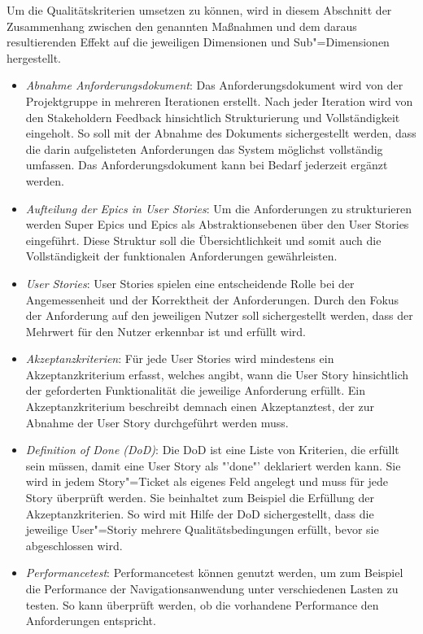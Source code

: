 Um die Qualitätskriterien umsetzen zu können, wird in diesem Abschnitt der Zusammenhang zwischen den genannten Maßnahmen und dem daraus resultierenden Effekt auf die jeweiligen Dimensionen und Sub"=Dimensionen hergestellt.
\begin{itemize}
    \item	\textit{Abnahme Anforderungsdokument}: Das Anforderungsdokument wird von der Projektgruppe in mehreren Iterationen erstellt. Nach jeder Iteration wird von den Stakeholdern Feedback hinsichtlich Strukturierung und Vollständigkeit eingeholt. So soll mit der Abnahme des Dokuments sichergestellt werden, dass die darin aufgelisteten Anforderungen das System möglichst vollständig umfassen. Das Anforderungsdokument kann bei Bedarf jederzeit ergänzt werden.
    \item	\textit{Aufteilung der Epics in User Stories}: Um die Anforderungen zu strukturieren werden Super Epics und Epics als Abstraktionsebenen über den User Stories eingeführt. Diese Struktur soll die Übersichtlichkeit und somit auch die Vollständigkeit der funktionalen Anforderungen gewährleisten.
    \item	\textit{User Stories}: User Stories spielen eine entscheidende Rolle bei der Angemessenheit und der Korrektheit der Anforderungen. Durch den Fokus der Anforderung auf den jeweiligen Nutzer soll sichergestellt werden, dass der Mehrwert für den Nutzer erkennbar ist und erfüllt wird.
    \item	\textit{Akzeptanzkriterien}: Für jede User Stories wird mindestens ein Akzeptanzkriterium erfasst, welches angibt, wann die User Story hinsichtlich der geforderten Funktionalität die jeweilige Anforderung erfüllt. Ein Akzeptanzkriterium beschreibt demnach einen Akzeptanztest, der zur Abnahme der User Story durchgeführt werden muss.
    \item	\textit{Definition of Done (DoD)}: Die DoD ist eine Liste von Kriterien, die erfüllt sein müssen, damit eine User Story als "'done"' deklariert werden kann. Sie wird in jedem Story"=Ticket als eigenes Feld angelegt und muss für jede Story überprüft werden. Sie beinhaltet zum Beispiel die Erfüllung der Akzeptanzkriterien. So wird mit Hilfe der DoD sichergestellt, dass die jeweilige User"=Storiy mehrere Qualitätsbedingungen erfüllt, bevor sie abgeschlossen wird.
    \item	\textit{Performancetest}: Performancetest können genutzt werden, um zum Beispiel die Performance der Navigationsanwendung unter verschiedenen Lasten zu testen. So kann überprüft werden, ob die vorhandene Performance den Anforderungen entspricht.

\end{itemize}
